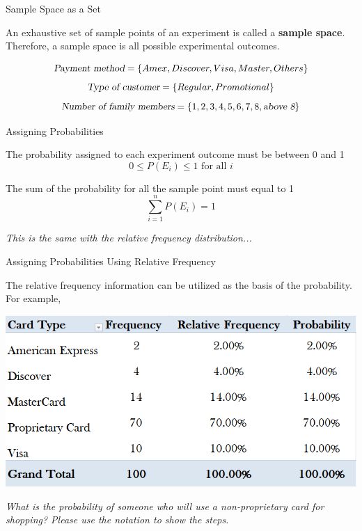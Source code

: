 \documentclass{beamer}
\begin{document}
\begin{frame}{Sample Space as a Set}

An exhaustive set of sample points of an experiment is called a \textbf{sample space}. Therefore, a sample space is all possible experimental outcomes.

$$ \textsl{Payment method} = \lbrace Amex, Discover, Visa, Master, Others \rbrace$$
$$\textsl{Type of customer} = \lbrace Regular, Promotional \rbrace $$
$$ \textsl{Number of family members} = \lbrace 1, 2, 3, 4, 5, 6, 7, 8, \textsl{above 8} \rbrace$$



\end{frame}







\begin{frame}{Assigning Probabilities}

The probability assigned to each experiment outcome must be between 0 and 1
$$ 0 \leq P(E_i) \leq 1 \text{ for all } i $$

\vspace{0.4 cm}
The sum of the probability for all the sample point must equal to 1
$$ \sum_{i=1}^n P(E_i) = 1 $$

\vspace{0.4 cm}
\textit{This is the same with the relative frequency distribution...
}\end{frame}


\begin{frame}{Assigning Probabilities Using Relative Frequency}

The relative frequency information can be utilized as the basis of the probability. For example,
\vspace{0.3cm}

\begin{center}
\includegraphics[scale=0.4]{images/ch3RelativeFrequency.png}

\vspace{0.3 cm}

\textit{What is the probability of someone who will use a non-proprietary card for shopping? Please use the notation to show the steps.
}
\end{center}

\end{frame}
\end{document}
